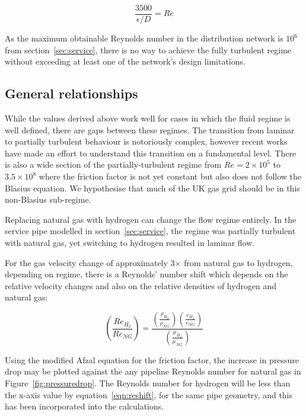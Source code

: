\documentclass[5p]{elsarticle} %
\begin{document}
\begin{equation}
\label{eqn:piggot}
   \frac{3500}{\epsilon/D} = Re
\end{equation}

As the maximum obtainable Reynolds number in the distribution network is $10^6$ from section~\ref{sec:service}, there is no way to achieve the fully turbulent regime without exceeding at least one of the network's design limitations.

\subsection{General relationships}
\label{sec:nonblasius}

While the values derived above work well for cases in which the fluid regime is well defined, there are gaps between these regimes. 
The transition from laminar to partially turbulent behaviour is notoriously complex, however recent works have made an effort to understand this transition on a fundamental level\citep{Goldenfeld2006, She2012}.
There is also a wide section of the partially-turbulent regime from $Re = 2\times10^5$ to $3.5\times10^8$ where the friction factor is not yet constant but also does not follow the Blasius equation.
We hypothesise that much of the UK gas grid should be in this non-Blasius sub-regime.

Replacing natural gas with hydrogen can change the flow regime entirely.
In the service pipe modelled in section~\ref{sec:service}, the regime was partially turbulent with natural gas, yet switching to hydrogen resulted in laminar flow.

For the  gas velocity change of approximately 3$\times$ from natural gas to hydrogen, depending on regime, there is a Reynolds' number shift which depends on the relative velocity changes and also on the relative densities of hydrogen and natural gas:

\begin{equation}
\label{eqn:reshift}
    \left(\frac{Re_{H_2}}{Re_{NG}}\right) = 
    \frac{
        \left(\frac{\rho_{H_2}}{\rho_{NG}}\right)
        \left(\frac{v_{H_2}}{v_{NG}}\right)
    }{
        \left(\frac{\mu_{H_2}}{\mu_{NG}}\right)
    }
\end{equation}


Using the modified Afzal equation for the friction factor, the increase in pressure drop may be plotted against the any pipeline Reynolds number for natural gas in Figure~\ref{fig:pressuredrop}.
The Reynolds number for hydrogen will be less than the x-axis value by equation~\eqref{eqn:reshift}, for the same pipe geometry, and this has been incorporated into the calculations. 
\end{document}
